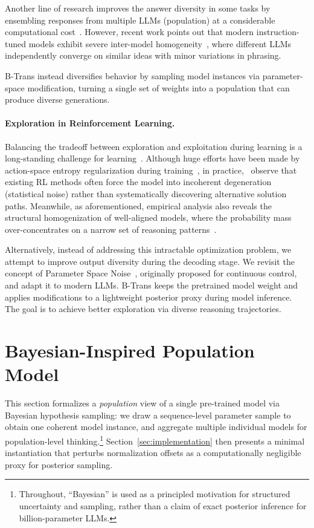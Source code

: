 \documentclass[11pt]{article}
\begin{document}
Another line of research improves the answer diversity in some tasks by ensembling responses from multiple LLMs (population) at a considerable computational cost~\cite{jiang2023llm}. However, recent work points out that modern instruction-tuned models exhibit severe inter-model homogeneity~\cite{jiang2025artificial}, where different LLMs independently converge on similar ideas with minor variations in phrasing. 

B-Trans instead diversifies behavior by sampling model instances via parameter-space modification, turning a single set of weights into a population that can produce diverse generations.


\paragraph{Exploration in Reinforcement Learning.}
Balancing the tradeoff between exploration and exploitation during learning is a long-standing challenge for learning~\cite{sutton1998reinforcement}. Although huge efforts have been made by action-space entropy regularization during training~\cite{haarnoja2018soft,schulman2017proximal}, in practice,~\citet{yue2025does} observe that existing RL methods often force the model into incoherent degeneration (statistical noise) rather than systematically discovering alternative solution paths. 
Meanwhile, as aforementioned, empirical analysis also reveals the structural homogenization of well-aligned models, where the probability mass over-concentrates on a narrow set of reasoning patterns~\cite{jiang2025artificial}.

Alternatively, instead of addressing this intractable optimization problem, we attempt to improve output diversity during the decoding stage. We revisit the concept of Parameter Space Noise~\cite{plappert2018parameter}, originally proposed for continuous control, and adapt it to modern LLMs. B-Trans keeps the pretrained model weight and applies modifications to a lightweight posterior proxy during model inference. The goal is to achieve better exploration via diverse reasoning trajectories.

\section{Bayesian-Inspired Population Model}
\label{sec:b-trans}
This section formalizes a \emph{population} view of a single pre-trained model via Bayesian hypothesis sampling: we draw a sequence-level parameter sample to obtain one coherent model instance, and aggregate multiple individual models for population-level thinking.\footnote{Throughout, ``Bayesian'' is used as a principled motivation for structured uncertainty and sampling, rather than a claim of exact posterior inference for billion-parameter LLMs.}
Section~\ref{sec:implementation} then presents a minimal instantiation that perturbs normalization offsets as a computationally negligible proxy for posterior sampling.
\end{document}
